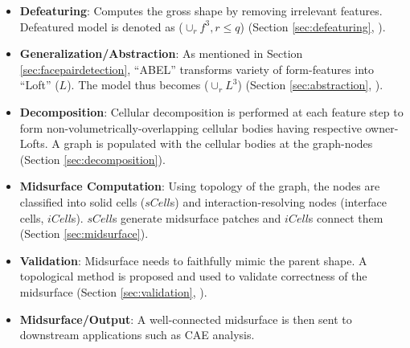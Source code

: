 
%
\begin{itemize}[noitemsep,topsep=2pt,parsep=2pt,partopsep=2pt,leftmargin=*]
\item \textbf{Defeaturing}: Computes the gross shape by removing irrelevant features. Defeatured model  is denoted as ($\cup_rf^3, r \leq q$)  (Section \ref{sec:defeaturing}, \cite{YogeshCADConf2015}). %

\item \textbf{Generalization/Abstraction}: As mentioned in Section \ref{sec:facepairdetection}, ``ABEL'' transforms variety of form-features into ``Loft'' ($L$). The model thus becomes ($\cup_rL^3$) (Section \ref{sec:abstraction}, \cite{YogeshIITG2014}). %

\item \textbf{Decomposition}: Cellular decomposition is performed at each feature step to form non-volumetrically-overlapping cellular bodies having respective owner-Lofts. A graph is populated with the cellular bodies at the graph-nodes (Section \ref{sec:decomposition}).

\item \textbf{Midsurface Computation}: Using topology of the graph, the nodes are classified into solid cells ($sCell$s) and interaction-resolving nodes (interface cells, $iCell$s).  $sCell$s generate midsurface patches and $iCell$s connect them (Section \ref{sec:midsurface}).

\item \textbf{Validation}:  Midsurface needs to faithfully mimic the parent shape. A topological method is proposed and used to validate correctness of the midsurface (Section \ref{sec:validation},  \cite{YogeshCADandA2015}).

\item  \textbf{Midsurface/Output}: A well-connected midsurface is then sent to downstream applications such as CAE analysis.  
\end{itemize}

